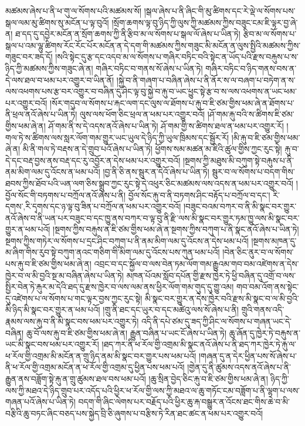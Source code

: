 མཚམས་ཞེས་པ་ནི་ཕ་གུ་ལ་སོགས་པའི་མཚམས་སོ། །སྒལ་ཞེས་པ་ནི་ཞིང་གི་མུ་ཚིགས་དང་རེ་ལྡེ་ལ་སོགས་པས་སྒལ་ལམ་མུ་ཚིགས་སུ་མངོན་པ་ལྟ་བུའོ། །སྲོག་ཆགས་ལྟ་བུ་ཉིད་ཀྱི་ལུས་ཀྱི་མཚམས་ཀྱིས་བཟུང་ངམ་ཇི་ལྟར་བྱ་ཞེ་ན། ཐ་དད་དུ་དབྱེར་མངོན་ན་སྲོག་ཆགས་ཀྱི་ནི་རྩིབ་མ་ལ་སོགས་པ་སྒལ་ལོ་ཞེས་པ་ཡིན་ཏེ། རྩིབ་མ་ལ་སོགས་པ་སྒལ་པ་འམ་ལྷུ་ཚིགས་རོང་རོང་པོར་མངོན་ན་དེ་དག་གི་མཚམས་ཀྱིས་གཟུང་མི་མངོན་ན་ལུས་སྤྱིའི་མཚམས་ཀྱིས་གཟུང་བར་ཟད་དོ། །སའི་སྟེང་དུ་རྩ་དང་འདབ་མ་ལ་སོགས་པ་གཞིར་བཏིང་བའི་སྟེང་ན་ཡོད་པའི་རྫས་བརྐུས་པ་ས་ཉིད་ཀྱི་མཚམས་ཀྱིས་གཟུང་ཞེ་ན། གཞིར་བཏིང་བ་གནས་སོ་ཞེས་པ་ཡིན་ཏེ། གཞིར་བཏིང་བ་ཉིད་གནས་བས་ན་དེ་ལས་ཐལ་བ་ཕམ་པར་འགྱུར་བ་ཡིན་ནོ། །སྐྱེ་བ་ནི་གཞག་པ་བཞིན་ཞེས་པ་ནི་ནོར་ས་ལ་བཞག་པ་བཏེག་ན་ས་ལས་འཕགས་པས་རྩ་བར་འགྱུར་བ་བཞིན་དུ་ཤིང་ལྟ་བུ་སྐྱེ་བ་རྐུ་བ་ཡང་ཕྱུང་སྟེ་རྩ་བ་ས་ལས་འཕགས་ན་ཡང་ཕམ་པར་འགྱུར་བའོ། །སོར་གདུབ་ལ་སོགས་པ་རྐང་ལག་དང་ལུས་ལ་ཐོགས་པ་རྐུ་བ་ཇི་ཙམ་གྱིས་ཕམ་ཞེ་ན་ཐོགས་པ་ནི་ཕྲལ་ནའོ་ཞེས་པ་ཡིན་ཏེ། ལུས་ལས་ཕོག་ཅིང་ཕྲལ་ན་ཕམ་པར་འགྱུར་བའོ། །ཤོ་གམ་རྐུ་བའི་ས་ཚིགས་ཇི་ཙམ་གྱིས་ཕམ་ཞེ་ན། ཤོ་གམ་ནི་ས་དེ་འདས་ནའོ་ཞེས་པ་ཡིན་ཏེ། ཤོ་གམ་གྱི་ས་ཚིགས་ཐལ་ན་ཕམ་པར་འགྱུར་རོ། །གལ་ཏེ་ས་ཚིགས་ལས་སླར་ལོག་གམ་གྱུར་ཡང་ཡུལ་དེ་ཉིད་ཀྱི་ཡུལ་ཁྲིམས་དང་སྦྱོར་རོ། །མི་རྐུ་བ་ཇི་ཙམ་གྱིས་ཕམ་ཞེ་ན། མི་ནི་གལ་ཏེ་བརྡས་ན་དེ་གྲུབ་པའོ་ཞེས་པ་ཡིན་ཏེ། ཕྱོགས་སམ་མཚན་མ་ཇིའི་ཚུལ་གྱིས་ཀྱང་རུང་སྟེ། རྐུ་བ་དེ་དང་བརྡ་བྱས་ནས་བརྡ་དང་རུ་འབྱོར་ན་དེས་ཕམ་པར་འགྱུར་བའོ། །སྔགས་ཀྱི་མཐུས་མི་བཀུག་སྟེ་བརྐུས་པ་ནི་ནམ་མིག་ལམ་དུ་འོངས་ན་ཕམ་པའོ། །བྱ་ནི་ཅི་ནས་སྦུར་ན་དེའོ་ཞེས་པ་ཡིན་ཏེ། སྦུར་བ་ལ་སོགས་པ་བདག་གིས་ཐབས་ཀྱིས་ཐོབ་པའི་ཡན་ལག་ཅིས་སྒྲུབ་ཀྱང་རུང་སྟེ་དེ་འཕུར་ཅིང་མཚམས་ལས་འདས་ན་ཕམ་པར་འགྱུར་བའོ། །བྱོལ་སོང་གི་བཏགས་པ་བཀྲོལ་ནའོ་ཞེས་པ་ནི། བྱོལ་སོང་རྐུ་བ་ནི་བཏགས་ཤིང་བརྟོད་པ་བཀྲོལ་བ་དང་། {རི་དགས་,རི་དྭགས་}དང་ཉ་ལྟ་བུ་ཟིན་པ་བཀྲོལ་ན་ཕམ་པར་འགྱུར་བའོ། །བཟུང་བའམ་བཀར་བ་ནི་མི་སྣང་བར་གྱུར་ནའོ་ཞེས་བ་ནི་ཡན་པར་བཟུང་བ་དང་ཁྱུ་ནས་བཀར་བ་ལྟ་བུ་ནི་རྫི་ལས་མི་སྣང་བར་གྱུར་ཏམ་ཁྱུ་ལས་མི་སྣང་བར་གྱུར་ན་ཕམ་པའོ། །སྔགས་ཀྱིས་བརྐུས་ན་ཇི་ཙམ་གྱིས་ཕམ་ཞེ་ན་སྔགས་ཀྱིས་བཀུག་པ་ནི་སྣང་ནའོ་ཞེས་པ་ཡིན་ཏེ། སྔགས་ཀྱིས་གཏེར་ལ་སོགས་པ་དྲང་ཤིང་བཀུག་པ་ནི་ནམ་མིག་ལམ་དུ་འོངས་ན་དེས་ཕམ་པའོ། །སྔགས་མཁན་དུ་མ་ཞིག་གིས་རུབ་སྟེ་བཀུག་ནའང་གཅིག་གི་མིག་ལམ་དུ་འོངས་པས་ཀུན་ཕམ་པའོ། །བེན་ཅིང་ནུར་བ་ལ་སོགས་པས་རྐུ་བ་ཇི་ཙམ་གྱིས་ཕམ་ཞེ་ན། འབྲང་བ་དང་སྐྱོལ་བ་ལས་བེན་ཏམ་ལོག་གམ་རྒྱུའམ་གབ་བམ་འཛེགས་ན་དེས་ཁྱེར་བ་ལ་མི་བྱའི་སྔ་མ་བཞིན་ཞེས་པ་ཡིན་ཏེ། མཁན་པོའམ་སློབ་དཔོན་གྱི་རྫས་ཁྱེར་ཏེ་ཕྱི་བཞིན་དུ་འགྲོ་བ་ལས་སྤྱིར་བེན་ཏེ་རྐུར་མ་དེའི་ཐད་དུ་རྫས་ཁྱེར་བ་ལས་ལམ་ནས་ཕྱིར་ལོག་གམ་གུད་དུ་གྱུ་འམ། གབ་བམ་འོག་ནས་སྟེང་དུ་འཛེགས་པ་ལ་སོགས་པ་གང་ལྟར་བྱས་ཀྱང་རུང་སྟེ། མི་སྣང་བར་གྱུར་ན་དེས་ཁྱེར་བའི་རྫས་མི་སྣང་བ་ལ་མི་བྱའི་མི་ཉིད་མི་སྣང་བར་གྱུར་ན་ཕམ་པའོ། །གྲུ་ནི་ཐང་དང་ཡུར་བ་དང་མཚེའུ་ལས་སོ་ཞེས་པ་ནི། གྲུའི་གནས་འདི་རྣམས་ལས་རྐུ་བ་ནི་མི་སྣང་བས་ཕམ་པར་འགྱུར་ཏེ། འདི་ནི་དཔེ་ཙམ་དུ་ཟད་ཀྱི་ཤིང་ལ་སོགས་པ་གཞན་ཡང་དེ་བཞིན། ཆུ་བོ་ལས་རྐུ་བ་ཇི་ཙམ་གྱིས་ཕམ་ཞེ་ན། རྒྱུན་བཞིན་པ་ཡང་ངོ་ཞེས་པ་ཡིན་ཏེ། ཆུ་ཞོན་དུ་ཁྱེར་ཏེ་བརྐུས་ན་ཡང་མི་སྣང་བས་ཕམ་པར་འགྱུར་རོ། །ཐད་ཀར་ནི་ཕ་རོལ་གྱི་འགྲམ་མི་སྣང་ནའོ་ཞེས་པ་ནི་ཐད་ཀར་ཁྱེར་ཏེ་རྐུ་ལ་ཕ་རོལ་གྱི་འགྲམ་མི་མངོན་ན་གྲུ་ཉིད་ནམ་མི་སྣང་བར་གྱུར་པས་ཕམ་པའོ། །གཞན་དུ་ན་དེར་ཕྱིན་པས་སོ་ཞེས་པ་ནི་ཕ་རོལ་གྱི་འགྲམ་མངོན་ན་ཕ་རོལ་གྱི་འགྲམ་དུ་ཕྱིན་པས་ཕམ་པའོ། །གྱེན་དུ་ནི་ཚུམས་འདས་ནའོ་ཞེས་པ་ནི་རྒྱུན་ནས་བཟློག་སྟེ་རྐུ་ན་གྲུ་ཚུམས་ཐལ་བས་ཕམ་པའོ། །ཆུ་སྲིན་བྱེད་ཅིང་རྐུ་བ་ཇི་ཙམ་གྱིས་ཕམ་ཞེ་ན། ཉིད་ཀྱི་ལས་ཀྱི་མཐའ་དེ་ཉིད་གྲུབ་པར་འདོད་པའི་ཕྱིར་ཕ་རོལ་གྱི་ལས་ཀྱི་མཐའ་ལ་ཆུ་གཏོང་ངམ་བཟློག་པ་ནི་ལྷག་པ་ལས་གཞན་པའོ་ཞེས་པ་ཡིན་ཏེ། བདག་གི་ཞིང་ལེགས་པར་བརྗོད་པའི་ཕྱིར་ཆུ་རྐ་བསྒྱུར་ན་འོངས་ཐང་གིས་ཆེ་བ་མི་བརྩིའི་ཆུ་བཏང་ཞིང་བཅད་པས་སྐྱེད་བྲི་ཅི་ཞུགས་པ་བརྩིས་ཏེ་རིན་ཐང་ཚང་ན་ཕམ་པར་འགྱུར་བའོ། 